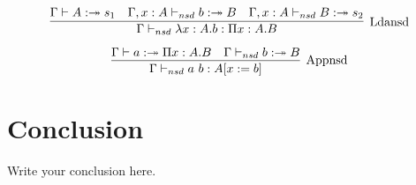 \documentclass{article}
\begin{document}
\begin{equation}
    \label{simple_equation}
\infer[\mathrm{Ldansd}]
{\Gamma \vdash_{nsd} \lambda x:A.b :\Pi x:A.B}{\Gamma \vdash A :\twoheadrightarrow s_{1} & \Gamma, x:A \vdash_{nsd} b:\twoheadrightarrow B & \Gamma, x:A \vdash_{nsd} B :\twoheadrightarrow s_{2}}
\end{equation}

\begin{equation}
    \label{simple_equation}
\infer[\mathrm{Appnsd}]
{\Gamma \vdash_{nsd} a\ b : A[x:=b]}{\Gamma \vdash a :\twoheadrightarrow \Pi x:A.B & \Gamma \vdash_{nsd} b:\twoheadrightarrow B }
\end{equation}


\section{Conclusion}
Write your conclusion here.


{}

\end{document}
